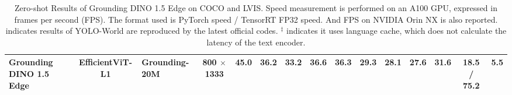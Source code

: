 \begin{table}[!h]
{\begin{tabular}{lclcccccccccccc}
Grounding DINO 1.5 Edge & EfficientViT-L1 & Grounding-20M &  800 $\times$ 1333 & \textbf{45.0} & \textbf{36.2} & \textbf{33.2} & \textbf{36.6} & \textbf{36.3} & \textbf{29.3} & \textbf{28.1} & \textbf{27.6} & 31.6 & 18.5 / 75.2 & 5.5 \\ %
\bottomrule
\end{tabular}}
\caption{Zero-shot Results of Grounding DINO 1.5 Edge on COCO and LVIS. Speed measurement is performed on an A100 GPU, expressed in frames per second (FPS). The format used is PyTorch speed / TensorRT FP32 speed. And FPS on NVIDIA Orin NX is also reported. \dag indicates results of YOLO-World are reproduced by the latest official codes. $^\ddagger$ indicates it uses language cache, which does not calculate the latency of the text encoder.}
\label{tab:edge}
\end{table} 
